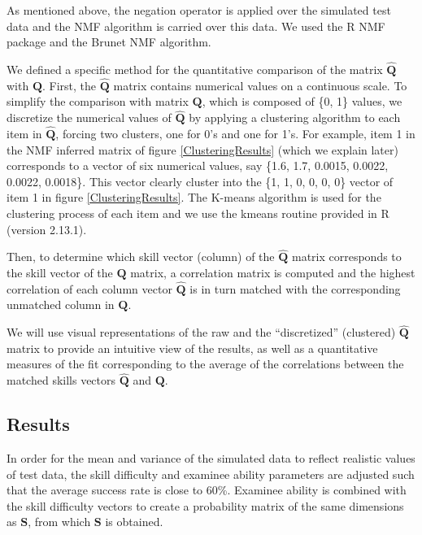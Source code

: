 As mentioned above, the negation operator is applied over the simulated test data and the NMF algorithm is carried over this data. We used the R NMF package \citep{Gaujoux2010} and the Brunet NMF algorithm.

We defined a specific method for the quantitative comparison of the matrix $\hat{\mathbf{Q}}$ with $\mathbf{Q}$. First, the $\hat{\mathbf{Q}}$ matrix contains numerical values on a continuous scale. To simplify the comparison with matrix $\mathbf{Q}$, which is composed of \{0, 1\} values, we discretize the numerical values of $\hat{\mathbf{Q}}$ by applying a clustering algorithm to each item in $\hat{\mathbf{Q}}$, forcing two clusters, one for 0\textquoteright{}s and one for 1\textquoteright{}s. For example, item 1 in the NMF inferred matrix of figure \ref{ClusteringResults}  (which we explain later) corresponds to a vector of six numerical values, say \{1.6, 1.7, 0.0015, 0.0022, 0.0022, 0.0018\}. This vector clearly cluster into the \{1, 1, 0, 0, 0, 0\} vector of item 1 in figure \ref{ClusteringResults}. The K-means algorithm is used for the clustering process of each item and we use the kmeans routine provided in R (version 2.13.1).

Then, to determine which skill vector (column) of the $\hat{\mathbf{Q}}$ matrix corresponds to the skill vector of the $\mathbf{Q}$ matrix, a correlation matrix is computed and the highest correlation of each column vector $\hat{\mathbf{Q}}$ is in turn matched with the corresponding unmatched column in $\mathbf{Q}$.

We will use visual representations of the raw and the \textquotedblleft{}discretized\textquotedblright{} (clustered) $\hat{\mathbf{Q}}$ matrix to provide an intuitive view of the results, as well as a quantitative measures of the fit corresponding to the average of the correlations between the matched skills vectors $\hat{\mathbf{Q}}$ and $\mathbf{Q}$.


\subsection{Results}


In order for the mean and variance of the simulated data to reflect realistic values of test data, the skill difficulty and examinee ability parameters are adjusted such that the average success rate is close to 60\%. Examinee ability is combined with the skill difficulty vectors to create a probability matrix of the same dimensions as $\mathbf{S}$, from which $\mathbf{S}$ is obtained.


